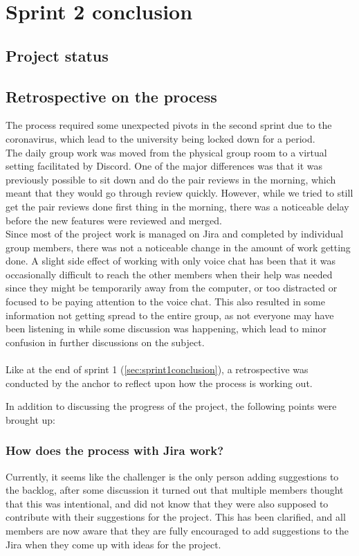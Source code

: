 \section{Sprint 2 conclusion}

\subsection{Project status}


\subsection{Retrospective on the process}
The process required some unexpected pivots in the second sprint due to the coronavirus, which lead to the university being locked down for a period.
\\
The daily group work was moved from the physical group room to a virtual setting facilitated by Discord.
One of the major differences was that it was previously possible to sit down and do the pair reviews in the morning, which meant that they would go through review quickly.
However, while we tried to still get the pair reviews done first thing in the morning, there was a noticeable delay before the new features were reviewed and merged.\\
Since most of the project work is managed on Jira and completed by individual group members, there was not a noticeable change in the amount of work getting done.
A slight side effect of working with only voice chat has been that it was occasionally difficult to reach the other members when their help was needed since they might be temporarily away from the computer, or too distracted or focused to be paying attention to the voice chat.
This also resulted in some information not getting spread to the entire group, as not everyone may have been listening in while some discussion was happening, which lead to minor confusion in further discussions on the subject.\\\\

Like at the end of sprint 1 (\autoref{sec:sprint1conclusion}), a retrospective was conducted by the anchor to reflect upon how the process is working out.

In addition to discussing the progress of the project, the following points were brought up:

\subsubsection{How does the process with Jira work?}
Currently, it seems like the challenger is the only person adding suggestions to the backlog, after some discussion it turned out that multiple members thought that this was intentional, and did not know that they were also supposed to contribute with their suggestions for the project.
This has been clarified, and all members are now aware that they are fully encouraged to add suggestions to the Jira when they come up with ideas for the project.

